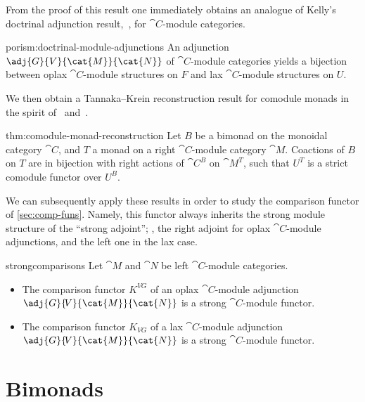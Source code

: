 From the proof of this result one immediately obtains
an analogue of Kelly's doctrinal adjunction result,~\cite{kelly74:doctr},
for \(\cat{C}\)\hyp{}module categories.

\begin{reptheorem}{porism:doctrinal-module-adjunctions}
  An adjunction \(\adj{G}{V}{\cat{M}}{\cat{N}}\) of \(\cat{C}\)\hyp{}module categories
  yields a bijection between oplax \(\cat{C}\)\hyp{}module structures on \(F\)
  and lax \(\cat{C}\)\hyp{}module structures on \(U\).
\end{reptheorem}

We then obtain a Tannaka--Krein reconstruction result for comodule monads
in the spirit of~\cite[Theorem~7.1]{Moerdijk2002} and~\cite[Corollary~3.13]{McCrudden2002}.

\begin{reptheorem}{thm:comodule-monad-reconstruction}
  Let \(B\) be a bimonad on the monoidal category \(\cat{C}\),
  and \(T\) a monad on a right \(\cat{C}\)\hyp{}module category \(\cat{M}\).
  Coactions of \(B\) on \(T\) are
  in bijection with
  right actions of \(\cat{C}^B\) on \(\cat{M}^T\), such that \(U^{T}\) is a strict comodule functor over \(U^{B}\).
\end{reptheorem}

We can subsequently apply these results in order to study the comparison functor of \cref{sec:comp-funs}.
Namely, this functor always inherits the strong module structure of the ``strong adjoint'';
\ie, the right adjoint for oplax \(\cat{C}\)\hyp{}module adjunctions, and the left one in the lax case.

\begin{reptheorem}{strongcomparisons}
  Let \(\cat{M}\) and \(\cat{N}\) be left \(\cat{C}\)\hyp{}module categories.
  \begin{itemize}[noitemsep]
    \item The comparison functor \(K^{VG}\)
    of an oplax \(\cat{C}\)\hyp{}module adjunction \(\adj{G}{\!{}V}{\cat{M}}{\cat{N}}\)
    is a strong \(\cat{C}\)\hyp{}module functor.
    \item
    The comparison functor \(K_{VG}\) of
    a lax \(\cat{C}\)\hyp{}module adjunction
    \(\adj{G}{\!{}V}{\cat{M}}{\cat{N}}\)
    is a strong \(\cat{C}\)\hyp{}module functor.
  \end{itemize}
\end{reptheorem}

\section{Bimonads}\label{sec:monads-bimonads}

